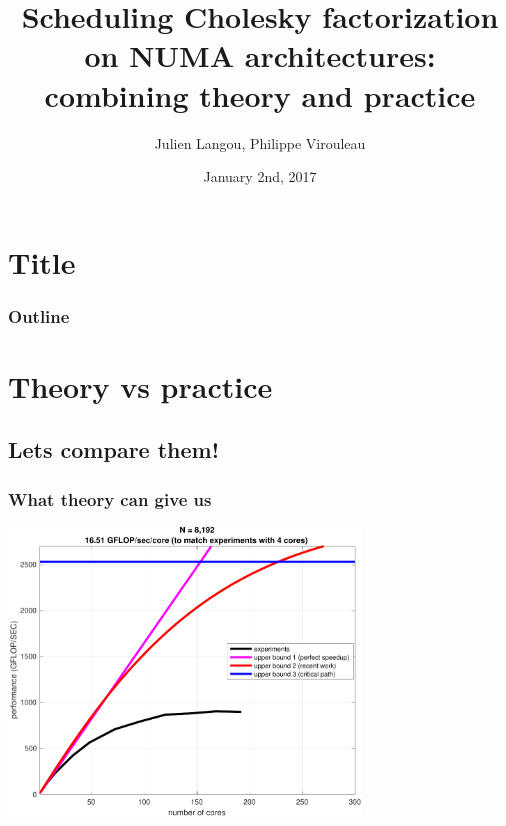 \documentclass[xcolor={usenames,dvipsnames,svgnames,table}, aspectratio=43]{beamer}
\title[Séminaire au vert]{Scheduling Cholesky factorization on NUMA architectures: combining theory and practice}
\author[J. Langou, P. Virouleau]{
Julien Langou, Philippe Virouleau}
\institute[CORSE/AVALON]{Inria - CORSE/AVALON teams}
\date{January 2nd, 2017}
\begin{document}



\section*{Title}
\mymaketitle

\begin{frame}
  \frametitle{Outline}
  \tableofcontents%
\end{frame}



\section{Theory vs practice}

\subsection{Lets compare them!}

\begin{frame}
  \frametitle{What theory can give us}
  \begin{center}
    \includegraphics[width=0.7\textwidth]{graph/kaapi_upperbound-crop.pdf}
  \end{center}
\end{frame}
\end{document}
